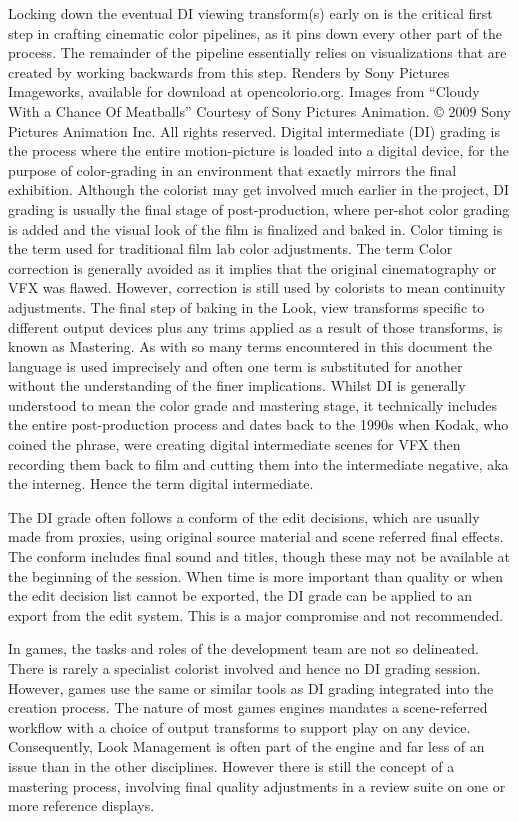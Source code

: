 Locking down the eventual DI viewing transform(s) early on is the critical first step in crafting cinematic color pipelines, as it pins down every other part of the process. The remainder of the pipeline essentially relies on visualizations that are created by working backwards from this step. 
Renders by Sony Pictures Imageworks, available for download at opencolorio.org. Images from “Cloudy With a Chance Of Meatballs” Courtesy of Sony Pictures Animation. © 2009 Sony Pictures Animation Inc. All rights reserved.
Digital intermediate (DI) grading is the process where the entire motion-picture is loaded into a digital device, for the purpose of color-grading in an environment that exactly mirrors the final exhibition.  Although the colorist may get involved much earlier in the project, DI grading is usually the final stage of post-production, where per-shot color grading is added and the visual look of the film is finalized and baked in. Color timing is the term used for traditional film lab color adjustments. The term Color correction is generally avoided as it implies that the original cinematography or VFX was flawed. However, correction is still used by colorists to mean continuity adjustments. The final step of baking in the Look, view transforms specific to different output devices plus any trims applied as a result of those transforms, is known as Mastering. As with so many terms encountered in this document the language is used imprecisely and often one term is substituted for another without the understanding of the finer implications. Whilst DI is generally understood to mean the color grade and mastering stage, it technically includes the entire post-production process and dates back to the 1990s when Kodak, who coined the phrase, were creating digital intermediate scenes for VFX then recording them back to film and cutting them into the intermediate negative, aka the interneg. Hence the term digital intermediate.

The DI grade often follows a conform of the edit decisions, which are usually made from proxies, using original source material and scene referred final effects. The conform includes final sound and titles, though these may not be available at the beginning of the session. When time is more important than quality or when the edit decision list cannot be exported, the DI grade can be applied to an export from the edit system. This is a major compromise and not recommended.

In games, the tasks and roles of the development team are not so delineated. There is rarely a specialist colorist involved and hence no DI grading session. However, games use the same or similar tools as DI grading integrated into the creation process. The nature of most games engines mandates a scene-referred workflow with a choice of output transforms to support play on any device. Consequently, Look Management is often part of the engine and far less of an issue than in the other disciplines. However there is still the concept of a mastering process, involving final quality adjustments in a review suite on one or more reference displays.

